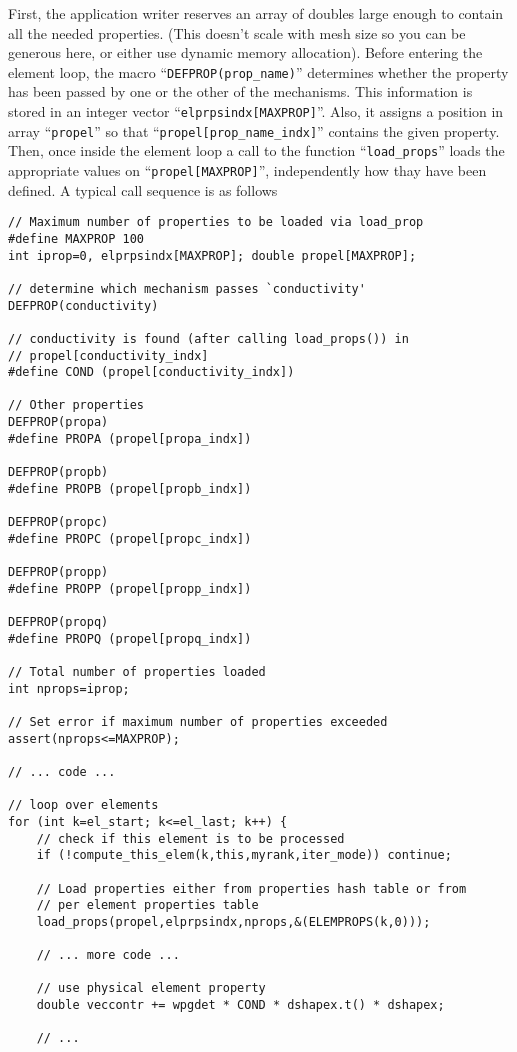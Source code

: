 First, the application writer reserves an array of doubles large
enough to contain all the needed properties. (This doesn't scale with
mesh size so you can be generous here, or either use dynamic memory
allocation). Before entering the element loop, the macro
``\verb+DEFPROP(prop_name)+'' determines whether the property has been
passed by one or the other of the mechanisms.  This information is
stored in an integer vector ``\verb+elprpsindx[MAXPROP]+''.  Also, it
assigns a position in array ``\verb+propel+'' so that
``\verb+propel[prop_name_indx]+'' contains the given property.  Then,
once inside the element loop a call to the function
``\verb+load_props+'' loads the appropriate values on
``\verb+propel[MAXPROP]+'', independently how thay have been
defined. A typical call sequence is as follows
%
%
\begin{verbatim}
// Maximum number of properties to be loaded via load_prop
#define MAXPROP 100
int iprop=0, elprpsindx[MAXPROP]; double propel[MAXPROP];

// determine which mechanism passes `conductivity'
DEFPROP(conductivity)

// conductivity is found (after calling load_props()) in
// propel[conductivity_indx]
#define COND (propel[conductivity_indx])

// Other properties 
DEFPROP(propa)
#define PROPA (propel[propa_indx])
 
DEFPROP(propb)
#define PROPB (propel[propb_indx])
 
DEFPROP(propc)
#define PROPC (propel[propc_indx])
 
DEFPROP(propp)
#define PROPP (propel[propp_indx])

DEFPROP(propq)
#define PROPQ (propel[propq_indx])

// Total number of properties loaded
int nprops=iprop;

// Set error if maximum number of properties exceeded 
assert(nprops<=MAXPROP);

// ... code ...
  
// loop over elements
for (int k=el_start; k<=el_last; k++) {
    // check if this element is to be processed
    if (!compute_this_elem(k,this,myrank,iter_mode)) continue;

    // Load properties either from properties hash table or from
    // per element properties table
    load_props(propel,elprpsindx,nprops,&(ELEMPROPS(k,0)));

    // ... more code ...

    // use physical element property
    double veccontr += wpgdet * COND * dshapex.t() * dshapex;

    // ...
\end{verbatim}
%

